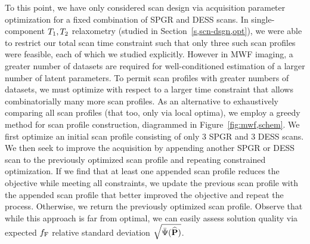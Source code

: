 To this point,
we have only considered scan design
via acquisition parameter optimization
for a fixed combination 
of SPGR and DESS scans.
In single-component $T_1,T_2$ relaxometry
(studied in Section~\ref{s,scn-dsgn,opt}),
we were able to restrict 
our total scan time constraint
such that only three such scan profiles were feasible,
each of which we studied explicitly.
However in MWF imaging,
a greater number of datasets are required
for well-conditioned estimation
of a larger number of latent parameters.
To permit scan profiles
with greater numbers of datasets,
we must optimize with respect
to a larger time constraint
that allows combinatorially many more scan profiles.
As an alternative
to exhaustively comparing all scan profiles
(that too, only via local optima),
we employ a greedy method 
for scan profile construction,
diagrammed in Figure~\ref{fig:mwf,schem}.
We first optimize
an initial scan profile consisting 
of only $3$ SPGR and $3$ DESS scans.
We then seek 
to improve the acquisition 
by appending another SPGR or DESS scan
to the previously optimized scan profile
and repeating constrained optimization.
If we find
that at least one appended scan profile
reduces the objective 
while meeting all constraints,
we update the previous scan profile
with the appended scan profile
that better improved the objective
and repeat the process. 
Otherwise, 
we return the previously optimized scan profile.
Observe that while this approach
is far from optimal,
we can easily assess solution quality 
via expected $f_{\mathrm{F}}$ relative standard deviation 
$\sqrt{\bar{\Psi}(\widehat{\mathbf{P}})}$.


